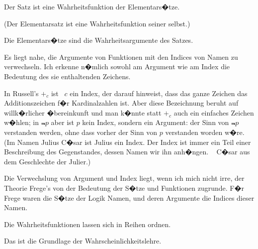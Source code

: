 {Der Satz ist eine Wahrheitsfunktion der Elementars�tze.

(Der Elementarsatz ist eine Wahrheitsfunktion
seiner selbst.)}


{Die Elementars�tze sind die Wahrheitsargumente
des Satzes.}


{Es liegt nahe, die Argumente von Funktionen
mit den Indices von Namen zu verwechseln. Ich
erkenne n�mlich sowohl am Argument wie am
Index die Bedeutung des sie enthaltenden Zeichens.

In Russell's \glqq{}$+_{c}$\grqq{} ist \zumBeispiel\ \glqq{}$c$\grqq{} ein Index, der darauf
hinweist, dass das ganze Zeichen das Additionszeichen
f�r Kardinalzahlen ist. Aber diese Bezeichnung
beruht auf willk�rlicher �bereinkunft und
man k�nnte statt \glqq{}$+_{c}$\grqq{} auch ein einfaches Zeichen
w�hlen; in \glqq{}$\Not{p}$\grqq{} aber ist \glqq{}$p$\grqq{} kein Index, sondern
ein Argument: der Sinn von \glqq{}$\Not{p}$\grqq{} 
verstanden werden, ohne dass vorher der Sinn von
\glqq{}$p$\grqq{} verstanden worden w�re. (Im Namen Julius
C�sar ist \glqq{}Julius\grqq{} ein Index. Der Index ist immer
ein Teil einer Beschreibung des Gegenstandes,
dessen Namen wir ihn anh�ngen. \ZumBeispiel\ 
C�sar aus dem Geschlechte der Julier.)

Die Verwechslung von Argument und Index
liegt, wenn ich mich nicht irre, der Theorie Frege's
von der Bedeutung der S�tze und Funktionen
zugrunde. F�r Frege waren die S�tze der Logik
Namen, und deren Argumente die Indices dieser
Namen.}


{Die Wahrheitsfunktionen lassen sich in Reihen
ordnen.

Das ist die Grundlage der Wahrscheinlichkeitslehre.}


